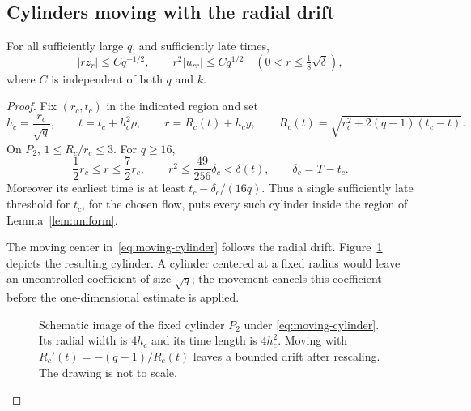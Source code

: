 \subsection{Cylinders moving with the radial drift}

\begin{lemma}\label{lem:largeq-derivatives}
For all sufficiently large \(q\), and sufficiently late times,
\begin{equation}\label{eq:largeq-derivatives}
|rz_r|\le Cq^{-1/2},\qquad r^2|u_{rr}|\le Cq^{1/2}
\quad\left(0<r\le\tfrac18\sqrt\delta\right),
\end{equation}
where \(C\) is independent of both \(q\) and \(k\).
\end{lemma}

\begin{proof}
Fix \((r_c,t_c)\) in the indicated region and set
\begin{equation}\label{eq:moving-cylinder}
h_c=\frac{r_c}{\sqrt q},\qquad
t=t_c+h_c^2\rho,\qquad
r=R_c(t)+h_cy,\qquad
R_c(t)=\sqrt{r_c^2+2(q-1)(t_c-t)}.
\end{equation}
On \(P_2\), \(1\le R_c/r_c\le3\). For \(q\ge16\),
\begin{equation}\label{eq:cylinder-inclusion}
\frac12r_c\le r\le\frac72r_c,
\qquad r^2\le\frac{49}{256}\delta_c<\delta(t),
\qquad \delta_c=T-t_c.
\end{equation}
Moreover its earliest time is at least
\(t_c-\delta_c/(16q)\). Thus a single sufficiently late threshold for
\(t_c\), for the chosen flow, puts every such cylinder inside the
region of Lemma~\ref{lem:uniform}.

The moving center in~\eqref{eq:moving-cylinder} follows the radial drift.
Figure~\ref{fig:drift} depicts the resulting cylinder. A cylinder centered
at a fixed radius would leave an uncontrolled coefficient of size
\(\sqrt q\); the movement cancels this coefficient before the
one-dimensional estimate is applied.

\begin{figure}[htbp]
\centering

\caption{Schematic image of the fixed cylinder \(P_2\) under
\eqref{eq:moving-cylinder}. Its radial width is \(4h_c\) and its time
length is \(4h_c^2\). Moving with \(R_c'(t)=-(q-1)/R_c(t)\) leaves
a bounded drift after rescaling. The drawing is not to scale.}
\label{fig:drift}
\end{figure}


\end{proof}
